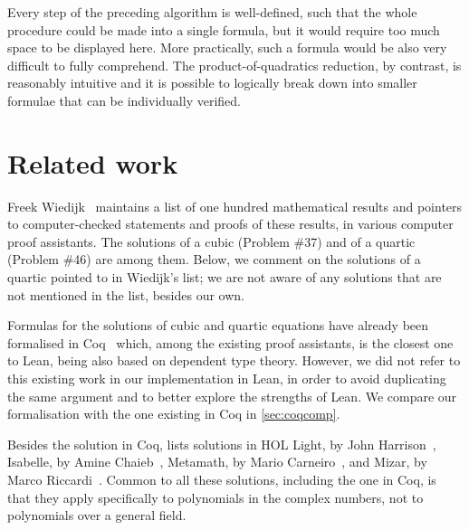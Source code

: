 \documentclass{article} %
\theoremstyle{plain}
\theoremstyle{definition}
\newcommand{\Lean}{\textsf{Lean}\xspace}
\begin{document}
Every step of the preceding algorithm is well-defined, such that
the whole procedure could be made into a single formula,
but it would require too much space to be displayed here.
More practically, such a formula would be also very difficult
to fully comprehend.
The product-of-quadratics reduction, by contrast,
is reasonably intuitive and it is possible to logically break down
into smaller formulae that can be individually verified.

\section{Related work}
\label{sec:relwork}


Freek Wiedijk~\cite{100_theorems} maintains a list of one hundred mathematical results and pointers to computer-checked statements and proofs of these results, in various computer proof assistants.
The solutions of a cubic (Problem \#37) and of a quartic (Problem \#46) are among them.
Below, we comment on the solutions of a quartic pointed to in Wiedijk's list; we are not aware of any solutions that are not mentioned in the list, besides our own.

Formulas for the solutions of cubic and quartic equations
have already been formalised in Coq~\cite{coq_proof} which,
among the existing proof assistants,
is the closest one to \Lean,
being also based on dependent type theory.
However, we did not refer to this existing work in our implementation in \Lean,
in order to avoid duplicating the same argument
and to better explore the strengths of \Lean.
We compare our formalisation with the one existing in Coq
in \cref{sec:coqcomp}.

Besides the solution in Coq, \cite{100_theorems} lists solutions in
HOL Light, by John Harrison~\cite{quartic-hol-light},
Isabelle, by Amine Chaieb~\cite{quartic-isabelle},
Metamath, by Mario Carneiro~\cite{quartic-metamath},
and
Mizar, by Marco Riccardi~\cite{quartic-mizar}.
Common to all these solutions, including the one in Coq, is that they apply specifically to polynomials in the complex numbers, not to polynomials over a general field.
\end{document}
